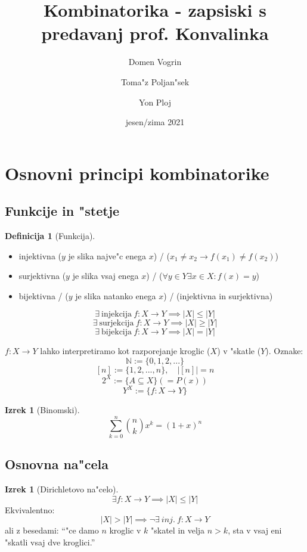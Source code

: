 \documentclass[a4paper,12pt]{article}
\theoremstyle{definition}
\newtheorem{defn}[counter]{Definicija}
\newtheorem{theorem}[counter]{Izrek}
\theoremstyle{remark}
\newcommand{\N}{\mathbb{N}}
\begin{document}
\title{Kombinatorika - zapsiski s predavanj prof. Konvalinka}
\author{
	Domen Vogrin
	\and
	Toma"z Poljan"sek
	\and
	Yon Ploj
}
\date{jesen/zima 2021}
\maketitle


\tableofcontents
\newpage
{}


\section{Osnovni principi kombinatorike}
\subsection{Funkcije in "stetje}

\begin{defn}[Funkcija] \text{}

\begin{itemize}
\item injektivna ($y$ je slika najve"c enega $x$) / ($x_1 \neq x_2 \rightarrow f(x_1) \neq f(x_2)$)
\item surjektivna ($y$ je slika vsaj enega $x$) / ($\forall y \in Y \exists x \in X:f(x) = y$)
\item bijektivna / ($y$ je slika natanko enega $x$) / (injektivna in surjektivna)
\end{itemize}
\end{defn}

\[
\exists \ \text{injekcija} \ f: X\rightarrow Y \implies |X|\leqslant |Y|
\]
\[
\exists \ \text{surjekcija} \ f: X\rightarrow Y \implies |X| \geqslant |Y|
\]
\[
\exists \ \text{bijekcija} \ f: X\rightarrow Y \implies |X| = |Y|
\]

$f: X \rightarrow Y$ lahko interpretiramo kot razporejanje kroglic ($X$) v "skatle ($Y$).
Oznake:
\[
\N := \{0, 1, 2, ...\}
\]
\[
[n] := \{1, 2, ..., n\}, \quad |[n]| = n
\]
\[
2^X := \{A\subseteq X\}  (= P(x))
\]
\[
Y^X := \{f: X\rightarrow Y\}
\]

\begin{theorem}[Binomski]
	\[ \sum_{k=0}^{n}\binom{n}{k} x^k = (1+x)^n \]
\end{theorem}


\subsection{Osnovna na"cela}
\begin{theorem}[Dirichletovo na"celo]
	\[
	\exists f: X\rightarrow Y \implies |X| \leqslant |Y|
	\]
	Ekvivalentno:
	\[
	|X| > |Y| \implies \neg \exists \ inj. \ f: X \rightarrow Y
	\]
	ali z besedami: ``"ce damo $n$ kroglic v $k$ "skatel in velja $n > k$, sta v vsaj eni "skatli vsaj dve kroglici.''
\end{theorem}
\end{document}
